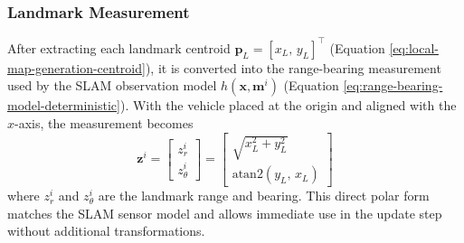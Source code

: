 \subsubsection{Landmark Measurement}
After extracting each landmark centroid $\mathbf{p}_L = [x_L,\, y_L]^\top$ (Equation \ref{eq:local-map-generation-centroid}), it is converted into the range-bearing measurement used by the SLAM observation model $h(\mathbf{x}, \mathbf{m}^i)$ (Equation \ref{eq:range-bearing-model-deterministic}). With the vehicle placed at the origin and aligned with the $x$-axis, the measurement becomes
\begin{equation}
    \mathbf{z}^i =
    \begin{bmatrix}
        z_r^i \\[0.3em]
        z_\theta^i
    \end{bmatrix}
    =
    \begin{bmatrix}
        \sqrt{x_L^2 + y_L^2} \\[0.3em]
        \mathrm{atan2}(y_L,\, x_L)
    \end{bmatrix}
    \label{eq:local-map-generation-landmark-measurement}
\end{equation}
where $z_r^i$ and $z_\theta^i$ are the landmark range and bearing. This direct polar form matches the SLAM sensor model and allows immediate use in the update step without additional transformations.



